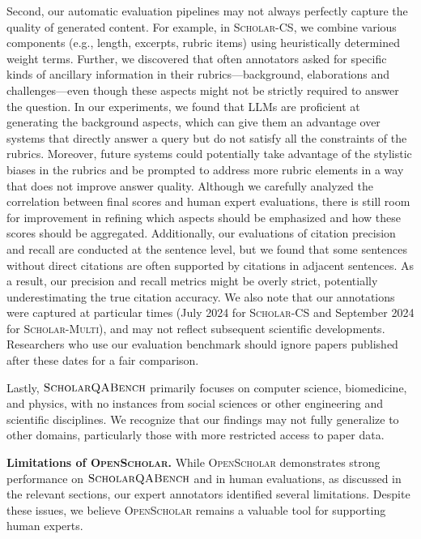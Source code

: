 \documentclass{article} %
\newcommand{\data}{$\textsc{ScholarQABench}$\xspace}
\newcommand{\model}{\textsc{OpenScholar}\xspace}
\renewcommand{\paragraph}[1]{\noindent \textbf{#1}}
\begin{document}
Second, our automatic evaluation pipelines may not always perfectly capture the quality of generated content. For example, in \textsc{Scholar-CS}, we combine various components (e.g., length, excerpts, rubric items) using heuristically determined weight terms. {Further, we discovered that often annotators asked for specific kinds of ancillary information in their rubrics---background, elaborations and challenges---even though these aspects might not be strictly required to answer the question. In our experiments, we found that LLMs are proficient at generating the background aspects, which can give them an advantage over systems that directly answer a query but do not satisfy all the constraints of the rubrics. Moreover, future systems could potentially take advantage of the stylistic biases in the rubrics and be prompted to address more rubric elements in a way that does not improve answer quality.} Although we carefully analyzed the correlation between final scores and human expert evaluations, there is still room for improvement in refining which aspects should be emphasized and how these scores should be aggregated. Additionally, our evaluations of citation precision and recall are conducted at the sentence level, but we found that some sentences without direct citations are often supported by citations in adjacent sentences. As a result, our precision and recall metrics might be overly strict, potentially underestimating the true citation accuracy.  We also note that our annotations were captured at particular times (July 2024 for \textsc{Scholar-CS} and September 2024 for \textsc{Scholar-Multi}), and may not reflect subsequent scientific developments. 
Researchers who use our evaluation benchmark should ignore papers published after these dates for a fair comparison.

Lastly, \data primarily focuses on computer science, biomedicine, and physics, with no instances from social sciences or other engineering and scientific disciplines. We recognize that our findings may not fully generalize to other domains, particularly those with more restricted access to paper data.

\paragraph{Limitations of \model.}
While \model demonstrates strong performance on \data and in human evaluations, as discussed in the relevant sections, our expert annotators identified several limitations. 
Despite these issues, we believe \model remains a valuable tool for supporting human experts. 
\end{document}
